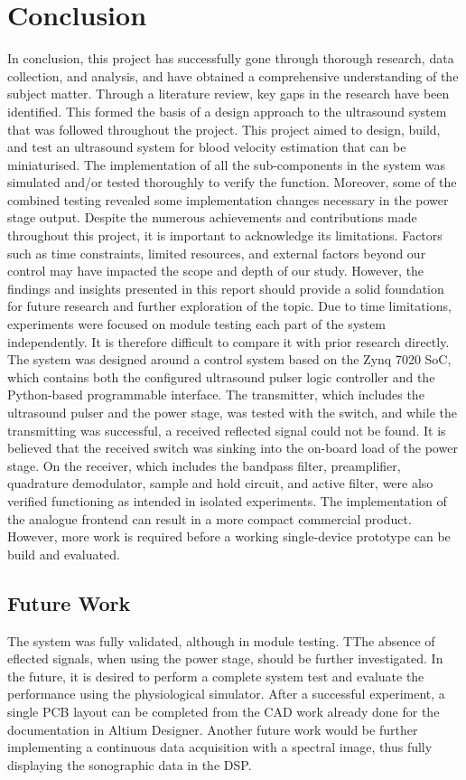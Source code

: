 \chapter{Conclusion}
In conclusion, this project has successfully gone through thorough research, data collection, and analysis, and have obtained a comprehensive understanding of the subject matter. Through a literature review, key gaps in the research have been identified. This formed the basis of a design approach to the ultrasound system that was followed throughout the project. This project aimed to design, build, and test an ultrasound system for blood velocity estimation that can be miniaturised. The implementation of all the sub-components in the system was simulated and/or tested thoroughly to verify the function. Moreover, some of the combined testing revealed some implementation changes necessary in the power stage output. Despite the numerous achievements and contributions made throughout this project, it is important to acknowledge its limitations. Factors such as time constraints, limited resources, and external factors beyond our control may have impacted the scope and depth of our study. However, the findings and insights presented in this report should provide a solid foundation for future research and further exploration of the topic. Due to time limitations, experiments were focused on module testing each part of the system independently. It is therefore difficult to compare it with prior research directly. The system was designed around a control system based on the Zynq 7020 SoC, which contains both the configured ultrasound pulser logic controller and the Python-based programmable interface. The transmitter, which includes the ultrasound pulser and the power stage, was tested with the switch, and while the transmitting was successful, a received reflected signal could not be found. It is believed that the received switch was sinking into the on-board load of the power stage.  On the receiver, which includes the bandpass filter, preamplifier, quadrature demodulator, sample and hold circuit, and active filter, were also verified functioning as intended in isolated experiments. The implementation of the analogue frontend can result in a more compact commercial product. However, more work is required before a working single-device prototype can be build and evaluated.
\section{Future Work}
The system was fully validated, although in module testing. TThe absence of eflected signals, when using the  power stage, should be further investigated. In the future, it is desired to perform a complete system test and evaluate the performance using the physiological simulator. After a successful experiment, a single PCB layout can be completed from the CAD work already done for the documentation in Altium Designer. Another future work would be further implementing a continuous data acquisition with a spectral image, thus fully displaying the sonographic data in the DSP. 
